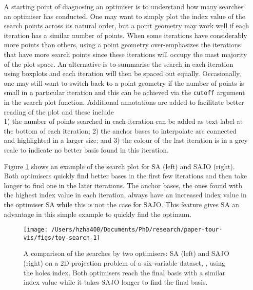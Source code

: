 A starting point of diagnosing an optimiser is to understand how many
searches an optimiser has conducted. One may want to simply plot the
index value of the search points across its natural order, but a point
geometry may work well if each iteration has a similar number of points.
When some iterations have considerably more points than others, using a
point geometry over-emphasizes the iterations that have more search
points since these iterations will occupy the mast majority of the plot
space. An alternative is to summarise the search in each iteration using
boxplots and each iteration will then be spaced out equally.
Occasionally, one may still want to switch back to a point geometry if
the number of points is small in a particular iteration and this can be
achieved via the \texttt{cutoff} argument in the search plot function.
Additional annotations are added to facilitate better reading of the
plot and these include\\
1) the number of points searched in each iteration can be added as text
label at the bottom of each iteration; 2) the anchor bases to
interpolate are connected and highlighted in a larger size; and 3) the
colour of the last iteration is in a grey scale to indicate no better
basis found in this iteration.

Figure \ref{fig:toy-search} shows an example of the search plot for SA
(left) and SAJO (right). Both optimisers quickly find better bases in
the first few iterations and then take longer to find one in the later
iterations. The anchor bases, the ones found with the highest index
value in each iteration, always have an increased index value in the
optimiser SA while this is not the case for SAJO. This feature gives SA
an advantage in this simple example to quickly find the optimum.

\begin{Schunk}
\begin{figure}

{\centering \texttt{[image: /Users/hzha400/Documents/PhD/research/paper-tour-vis/figs/toy-search-1]} 

}

\caption[A comparison of the searches by two optimisers]{A comparison of the searches by two optimisers: SA (left) and SAJO (right) on a 2D projection problem of a six-variable dataset, , using the holes index. Both optimisers reach the final basis with a similar index value while it takes SAJO longer to find the final basis.}\label{fig:toy-search}
\end{figure}
\end{Schunk}

